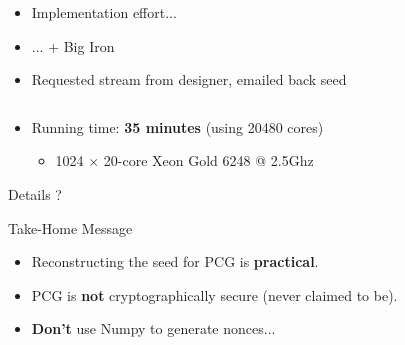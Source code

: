 \documentclass[11pt,xcolor={x11names,svgnames}]{beamer}
\begin{document}
\begin{frame}[label=bragging]
\begin{columns}
\begin{column}[T]{6cm}
      \begin{itemize}
      \item Implementation effort...
      \item ... + Big Iron
        \medskip
      \item Requested stream from designer, emailed back seed

      \end{itemize}
    \end{column}
  \end{columns}

  \medskip
  
  \begin{itemize}
  \item Running time: \textbf{35 minutes} {\tiny (using 20480 cores)}
    \medskip
    \begin{itemize}\footnotesize
    \item 1024 $\times$ 20-core \textsf{Xeon Gold 6248 @ 2.5Ghz}
    \end{itemize}
  \end{itemize}
  \end{frame}


  \begin{frame}

    \begin{exampleblock}{Details ?}
      \begin{center}
    \end{center}
  \end{exampleblock}

    \bigskip

\begin{block}{Take-Home Message}
  \begin{itemize}
    \item Reconstructing the seed for PCG is \textbf{practical}.
    \item PCG is \textbf{not} cryptographically secure (never claimed to be).
    \item \textbf{Don't} use \textsf{Numpy} to generate nonces...
    \end{itemize}
  \end{block}
\end{frame}
\end{document}
